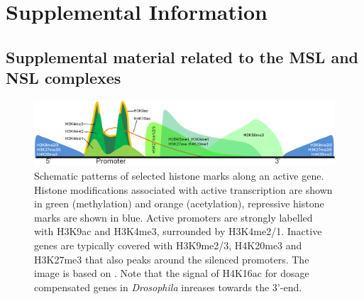 
\chapter{Supplemental Information} %
\label{SuppInfo} %
\fancyfoot{}
\fancyfoot[C]{\thepage}

%
\section{Supplemental material related to the MSL and NSL complexes}
%
\begin{figure}[h!]
\includegraphics[width=1\textwidth]{Figures/histoneMarkDistribution.png}
\begin{footnotesize}
\setlength{\abovecaptionskip}{0ex}
\caption[Distribution of histone marks along an active gene.]{\textsf{Schematic patterns of selected histone marks along an active gene. Histone modifications associated with active transcription are shown in green (methylation) and orange (acetylation), repressive histone marks are shown in blue. Active promoters are strongly labelled with H3K9ac and H3K4me3, surrounded by H3K4me2/1. Inactive genes are typically covered with H3K9me2/3, H4K20me3 and H3K27me3 that also peaks around the silenced promoters. The image is based on \citep{Barth2010}. Note that the signal of H4K16ac for dosage compensated genes in \textit{Drosophila} inreases towards the 3'-end.}}
\label{fig:histoneDistribution}
\end{footnotesize}
\end{figure}

%
